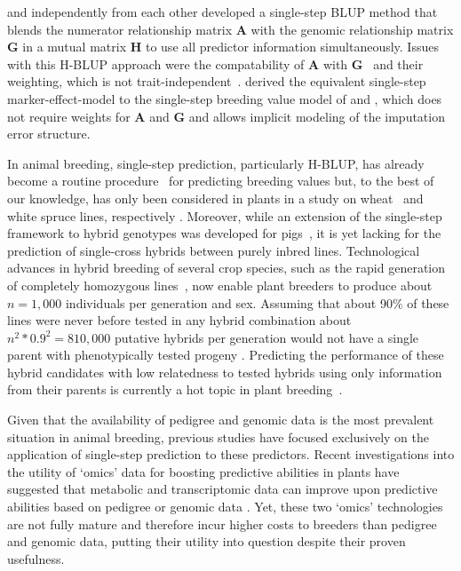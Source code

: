 \documentclass[12pt,titlepage]{article}
\begin{document}
 and  independently from each other
developed a single-step BLUP method that blends the numerator relationship matrix
$\mathbf{A}$ with the genomic relationship matrix $\mathbf{G}$ in a mutual matrix
$\mathbf{H}$ to use all predictor information simultaneously.
Issues with this H-BLUP approach were the compatability of $\mathbf{A}$ with
$\mathbf{G}$~\cite{Christensen2012} and their weighting, which is not
trait-independent~\cite{Vitezica2011,Ashraf2016}.
 derived the equivalent single-step marker-effect-model to 
the single-step breeding value model of  and 
, which does not require weights for $\mathbf{A}$ and 
$\mathbf{G}$ and allows implicit modeling of the imputation error structure.


In animal breeding, single-step prediction, particularly H-BLUP, has already 
become a routine procedure~\cite{Legarra2014} for predicting breeding values
but, to the best of our knowledge, has only been considered in plants in a study
on wheat~\cite{Ashraf2016} and white spruce lines, respectively
\cite{Ratcliffe2017}.
Moreover, while an extension of the single-step framework to hybrid genotypes
was developed for pigs~\cite{Xiang2016}, it is yet lacking for the prediction
of single-cross hybrids between purely inbred lines.
Technological advances in hybrid breeding of several crop species, such as the
rapid generation of completely homozygous lines~\cite{Wedzony2009}, now enable
plant breeders to produce about $n = 1,000$ individuals per generation and sex.
Assuming that about 90\% of these lines were never before tested in any hybrid
combination about $n^{2} * 0.9^{2} = 810,000$ putative hybrids per generation
would not have a single parent with phenotypically tested progeny
\cite{Westhues2017}.
Predicting the performance of these hybrid candidates with low relatedness to 
tested hybrids using only information from their parents is currently a hot topic
in plant breeding~\cite{Technow2014,Kadam2016,Westhues2017}.

Given that the availability of pedigree and genomic data is the most prevalent
situation in animal breeding, previous studies have focused exclusively on the
application of single-step prediction to these predictors.
Recent investigations into the utility of `omics' data for boosting predictive
abilities in plants have suggested that metabolic and transcriptomic data can
improve upon predictive abilities based on pedigree or genomic data
\cite{Guo2016,Xu2016,Dan2016,Zenke-Philippi2017,Westhues2017}.
Yet, these two `omics' technologies are not fully mature and therefore incur
higher costs to breeders than pedigree and genomic data, putting their utility
into question despite their proven usefulness.
\end{document}
